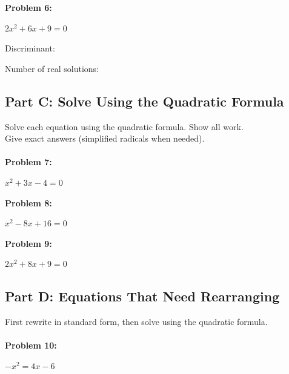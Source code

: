 \documentclass[12pt]{article}
\begin{document}
			\vspace{0.5cm}

			\textbf{Problem 6:}
            
            $2x^2 + 6x + 9 = 0$

			\vspace{2.7cm}

			Discriminant: \underline{\hspace{2in}}

			\vspace{0.5cm}

			Number of real solutions: \underline{\hspace{2in}}

			\newpage

		\subsection*{Part C: Solve Using the Quadratic Formula}

			Solve each equation using the quadratic formula. Show all work.\\

			Give exact answers (simplified radicals when needed).\\\\

			\textbf{Problem 7:}
            
            $x^2 + 3x - 4 = 0$

			\vspace{5cm}

			\textbf{Problem 8:}
            
            $x^2 - 8x + 16 = 0$

			\vspace{5cm}

			\textbf{Problem 9:}
            
            $2x^2 + 8x + 9 = 0$

			\newpage

		\subsection*{Part D: Equations That Need Rearranging}

			First rewrite in standard form, then solve using the quadratic formula.\\\\

			\textbf{Problem 10:}
            
            $-x^2 = 4x - 6$
\end{document}
